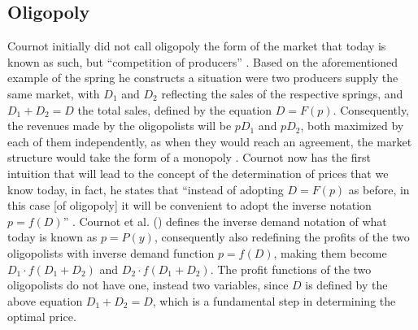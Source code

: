 \documentclass[12pt]{article}
\numberwithin{equation}{subsection}
\let\oldsubsection\subsection%
\renewcommand{\subsection}{%
  \renewcommand{\theequation}{\thesubsection.\arabic{equation}}%
  \oldsubsection}%
\begin{document}
\subsection{Oligopoly}
\label{sec:oligo}
Cournot initially did not call oligopoly the form of the market that today is known as such, but ``competition of producers'' \cite[p. 79]{cournot1897researches}. Based on the aforementioned example of the spring he constructs a situation were two producers supply the same market, with $D_1$ and $D_2$ reflecting the sales of the respective springs, and $D_1+D_2 = D$ the total sales, defined by the equation $D = F(p)$. Consequently, the revenues made by the oligopolists will be $pD_1$ and $pD_2$, both maximized by each of them independently, as when they would reach an agreement, the market structure would take the form of a monopoly \cite[p. 79-80]{cournot1897researches}. Cournot now has the first intuition that will lead to the concept of the determination of prices that we know today, in fact, he states that ``instead of adopting $D = F(p)$ as before, in this case [of oligopoly] it will be convenient to adopt the inverse notation $p=f(D)$'' \cite[p. 80]{cournot1897researches}. Cournot et al. (\citeyear[p. 79-80]{cournot1897researches}) defines the inverse demand notation of what today is known as $p=P(y)$, consequently also redefining the profits of the two oligopolists with inverse demand function $p=f(D)$, making them become $D_1 \cdot f(D_1+D_2)$ and $D_2 \cdot f(D_1+D_2)$. The profit functions of the two oligopolists do not have one, instead two variables, since $D$ is defined by the above equation $D_1+D_2 = D$, which is a fundamental step in determining the optimal price.
\end{document}
